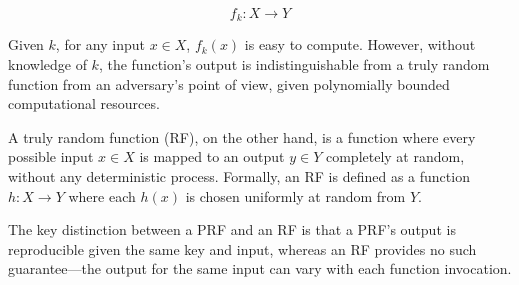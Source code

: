 \documentclass[12pt,openany]{book}
\theoremstyle{definition}
\begin{document}
\[ f_k: X \rightarrow Y \]

Given \( k \), for any input \( x \in X \), \( f_k(x) \) is easy to compute. However, without knowledge of \( k \), the function's output is indistinguishable from a truly random function from an adversary's point of view, given polynomially bounded computational resources.

A truly random function (RF), on the other hand, is a function where every possible input \( x \in X \) is mapped to an output \( y \in Y \) completely at random, without any deterministic process. Formally, an RF is defined as a function \( h: X \rightarrow Y \) where each \( h(x) \) is chosen uniformly at random from \( Y \).

The key distinction between a PRF and an RF is that a PRF's output is reproducible given the same key and input, whereas an RF provides no such guarantee—the output for the same input can vary with each function invocation.
\end{document}
